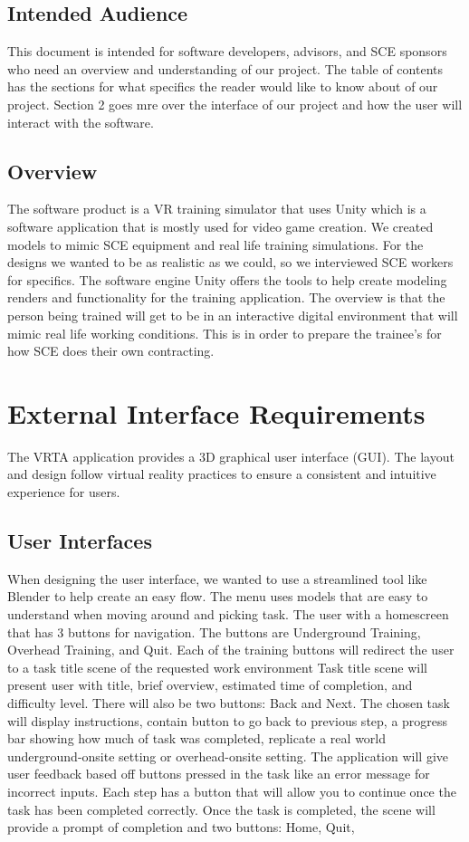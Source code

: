 \documentclass[12pt]{article}
\begin{document}
\subsection{Intended Audience}
This document is intended for software developers, advisors, and SCE sponsors who need an overview and understanding of our project.
The table of contents has the sections for what specifics the reader would like to know about of our project.
Section 2 goes mre over the interface of our project and how the user will interact with the software.

\subsection{Overview}
The software product is a VR training simulator that uses Unity which is a software application that is mostly used for video game creation.
We created models to mimic SCE equipment and real life training simulations. For the designs we wanted to be as realistic as we could, 
so we interviewed SCE workers for specifics.
The software engine Unity offers the tools to help create modeling renders and functionality for the training application. 
The overview is that the person being trained will get to be in an interactive digital environment that will mimic real life working conditions.
This is in order to prepare the trainee's for how SCE does their own contracting.


\section{External Interface Requirements}
The VRTA application provides a 3D graphical user interface (GUI). 
The layout and design follow virtual reality practices to ensure a consistent and intuitive experience for users.

\subsection{User Interfaces}
When designing the user interface, we wanted to use a streamlined tool like Blender to help create an easy flow.
The menu uses models that are easy to understand when moving around and picking task.
The user with a homescreen that has 3 buttons for navigation. 
The buttons are Underground Training, Overhead Training, and Quit.
Each of the training buttons will redirect the user to a task title scene of the requested work environment
Task title scene will present user with title, brief overview, estimated time of completion, and difficulty level.
There will also be two buttons: Back and Next.
The chosen task will display instructions, contain button to go back to previous step, a progress bar showing how much of task was completed, 
replicate a real world underground-onsite setting or overhead-onsite setting.
The application will give user feedback based off buttons pressed in the task like an error message for incorrect inputs.
Each step has a button that will allow you to continue once the task has been completed correctly.
Once the task is completed, the scene will provide a prompt of completion and two buttons:
Home, Quit,
\end{document}
